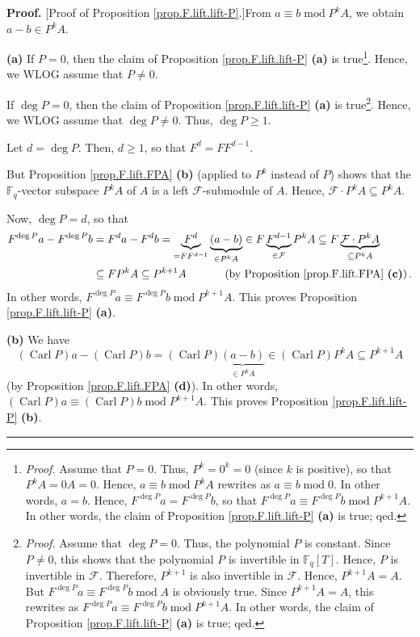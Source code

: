 \documentclass[numbers=enddot,12pt,final,onecolumn,notitlepage]{scrartcl}%
\theoremstyle{definition}
\newenvironment{proof}[1][Proof]{\noindent\textbf{#1.} }{\ \rule{0.5em}{0.5em}}
\begin{document}
\begin{proof}
[Proof of Proposition \ref{prop.F.lift.lift-P}.]From $a\equiv
b\operatorname{mod}P^{k}A$, we obtain $a-b\in P^{k}A$. \medskip

\textbf{(a)} If $P=0$, then the claim of Proposition \ref{prop.F.lift.lift-P}
\textbf{(a)} is true\footnote{\textit{Proof.} Assume that $P=0$. Thus,
$P^{k}=0^{k}=0$ (since $k$ is positive), so that $P^{k}A=0A=0$. Hence,
$a\equiv b\operatorname{mod}P^{k}A$ rewrites as $a\equiv b\operatorname{mod}%
0$. In other words, $a=b$. Hence, $F^{\deg P}a=F^{\deg P}b$, so that $F^{\deg
P}a\equiv F^{\deg P}b\operatorname{mod}P^{k+1}A$. In other words, the claim of
Proposition \ref{prop.F.lift.lift-P} \textbf{(a)} is true; qed.}. Hence, we
WLOG assume that $P\neq0$.

If $\deg P=0$, then the claim of Proposition \ref{prop.F.lift.lift-P}
\textbf{(a)} is true\footnote{\textit{Proof.} Assume that $\deg P=0$. Thus,
the polynomial $P$ is constant. Since $P\neq0$, this shows that the polynomial
$P$ is invertible in $\mathbb{F}_{q}\left[  T\right]  $. Hence, $P$ is
invertible in $\mathcal{F}$. Therefore, $P^{k+1}$ is also invertible in
$\mathcal{F}$. Hence, $P^{k+1}A=A$. But $F^{\deg P}a\equiv F^{\deg
P}b\operatorname{mod}A$ is obviously true. Since $P^{k+1}A=A$, this rewrites
as $F^{\deg P}a\equiv F^{\deg P}b\operatorname{mod}P^{k+1}A$. In other words,
the claim of Proposition \ref{prop.F.lift.lift-P} \textbf{(a)} is true; qed.}.
Hence, we WLOG assume that $\deg P\neq0$. Thus, $\deg P\geq1$.

Let $d=\deg P$. Then, $d\geq1$, so that $F^{d}=FF^{d-1}$.

But Proposition \ref{prop.F.lift.FPA} \textbf{(b)} (applied to $P^{k}$ instead
of $P$) shows that the $\mathbb{F}_{q}$-vector subspace $P^{k}A$ of $A$ is a
left $\mathcal{F}$-submodule of $A$. Hence, $\mathcal{F}\cdot P^{k}A\subseteq
P^{k}A$.

Now, $\deg P=d$, so that%
\begin{align*}
F^{\deg P}a-F^{\deg P}b  &  =F^{d}a-F^{d}b=\underbrace{F^{d}}_{=FF^{d-1}%
}\underbrace{\left(  a-b\right)  }_{\in P^{k}A}\in F\underbrace{F^{d-1}}%
_{\in\mathcal{F}}P^{k}A\subseteq F\underbrace{\mathcal{F}\cdot P^{k}%
A}_{\subseteq P^{k}A}\\
&  \subseteq FP^{k}A\subseteq P^{k+1}A\ \ \ \ \ \ \ \ \ \ \left(  \text{by
Proposition \ref{prop.F.lift.FPA} \textbf{(c)}}\right)  .
\end{align*}
In other words, $F^{\deg P}a\equiv F^{\deg P}b\operatorname{mod}P^{k+1}A$.
This proves Proposition \ref{prop.F.lift.lift-P} \textbf{(a)}. \medskip

\textbf{(b)} We have%
\[
\left(  \operatorname*{Carl}P\right)  a-\left(  \operatorname*{Carl}P\right)
b=\left(  \operatorname*{Carl}P\right)  \underbrace{\left(  a-b\right)  }_{\in
P^{k}A}\in\left(  \operatorname*{Carl}P\right)  P^{k}A\subseteq P^{k+1}A
\]
(by Proposition \ref{prop.F.lift.FPA} \textbf{(d)}). In other words, $\left(
\operatorname*{Carl}P\right)  a\equiv\left(  \operatorname*{Carl}P\right)
b\operatorname{mod}P^{k+1}A$. This proves Proposition \ref{prop.F.lift.lift-P}
\textbf{(b)}.
\end{proof}
\end{document}
